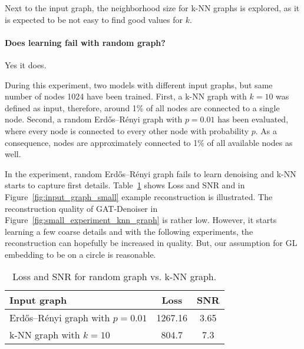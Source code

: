   Next to the input graph, the neighborhood size for k-NN graphs is explored, as it is expected to be not easy to find 
  good values for $k$.

  \paragraph{Does learning fail with random graph?}
  Yes it does.

  During this experiment, two models with different input graphs, but same number of nodes 1024 have been trained.
  First, a k-NN graph with $k=10$ was defined as input, therefore, around 1\%  of all nodes are connected to a single node.
  Second, a random Erdős–Rényi graph with $p=0.01$ has been evaluated, where every node is 
  connected to every other node with probability $p$. 
  As a consequence, nodes are approximately connected to 1\% of all available nodes as well.
  
  In the experiment, random Erdős–Rényi graph fails to learn denoising and k-NN starts to capture first details.
  Table~\ref{tab:input_graph} shows Loss and SNR and in Figure~\ref{fig:input_graph_small} example reconstruction is illustrated.
  The reconstruction quality of GAT-Denoiser in Figure~\ref{fig:small_experiment_knn_graph} is rather low. 
  However, it starts learning a few coarse details and with the following experiments, the reconstruction can hopefully be 
  increased in quality. But, our assumption for GL embedding to be on a circle is reasonable.

  \begin{table}[H]
    \centering
      \begin{tabular}{l|cc}
      \toprule
      \textbf{Input graph} & \textbf{Loss} & \textbf{SNR}  \\ 
      \midrule
      Erdős–Rényi graph with $p=0.01$    &  1267.16         &  3.65   \\ \hline
      k-NN graph with $k=10$             &  804.7           &  7.3    \\ \hline
      \midrule
      \end{tabular}
    \caption{Loss and SNR for random graph vs. k-NN graph. }
    \label{tab:input_graph}
  \end{table}

